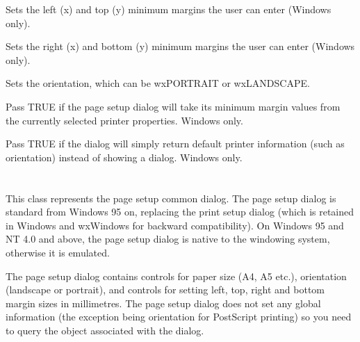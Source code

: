 \label{wxpagesetupdatasetminmargintopleft}


Sets the left (x) and top (y) minimum margins the user can enter (Windows only).

\label{wxpagesetupdatasetminmarginbottomright}


Sets the right (x) and bottom (y) minimum margins the user can enter (Windows only).

\label{wxpagesetupdatasetorientation}


Sets the orientation, which can be wxPORTRAIT or wxLANDSCAPE.

\label{wxpagesetupdatasetdefaultminmargins}


Pass TRUE if the page setup dialog will take its minimum margin values from the currently
selected printer properties. Windows only.

\label{wxpagesetupdatasetdefaultinfo}


Pass TRUE if the dialog will simply return default printer information (such as orientation)
instead of showing a dialog. Windows only.

\section{}\label{wxpagesetupdialog}

This class represents the page setup common dialog. The page setup dialog is standard from
Windows 95 on, replacing the print setup dialog (which is retained in Windows and wxWindows
for backward compatibility). On Windows 95 and NT 4.0 and above, the page setup dialog is
native to the windowing system, otherwise it is emulated.

The page setup dialog contains controls for paper size (A4, A5 etc.), orientation (landscape
or portrait), and controls for setting left, top, right and bottom margin sizes in millimetres.
The page setup dialog does not set any global information (the exception being orientation
for PostScript printing) so you need to query the  object
associated with the dialog.

